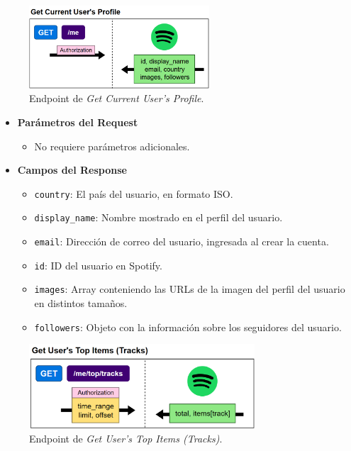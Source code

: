 \vspace{-7pt}
\begin{figure}[H]
    \centering
    \includegraphics[width=0.6\textwidth]{figures/endpoints/get_current_users_profile.png}
    \caption{Endpoint de \textit{Get Current User's Profile}.}
    \label{fig:get_current_usr_profile}
\end{figure}

\begin{itemize}
    \item \textbf{Parámetros del Request}
          \begin{itemize}
              \item No requiere parámetros adicionales.
          \end{itemize}
    \item \textbf{Campos del Response}
          \begin{itemize}
              \item \texttt{country}: El país del usuario, en formato ISO.
              \item \texttt{display\_name}: Nombre mostrado en el perfil del usuario.
              \item \texttt{email}: Dirección de correo del usuario, ingresada al crear la cuenta.
              \item \texttt{id}: ID del usuario en Spotify.
              \item \texttt{images}: Array conteniendo las URLs de la imagen del perfil del usuario en distintos tamaños.
              \item \texttt{followers}: Objeto con la información sobre los seguidores del usuario.
          \end{itemize}
\end{itemize}

\vspace{-5pt}
\begin{figure}[H]
    \centering
    \includegraphics[width=0.75\textwidth]{figures/endpoints/get_users_top_items_tracks.png}
    \caption{Endpoint de \textit{Get User's Top Items (Tracks)}.}
    \label{fig:get_usr_top_items_tracks}
\end{figure}

